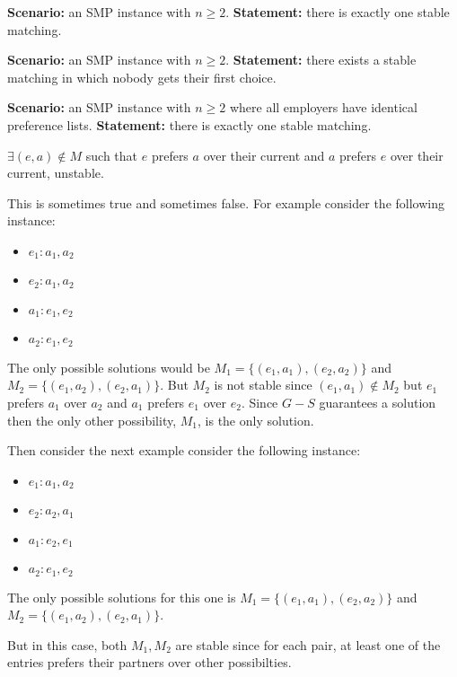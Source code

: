 \begin{questions}
	\question[3] \textbf{Scenario:} an SMP instance with $n \ge 2$. \textbf{Statement:} there is exactly one stable matching.
	\ifsolutions\fi

	\question[4] \textbf{Scenario:} an SMP instance with $n \ge 2$. \textbf{Statement:} there exists a stable matching in which nobody gets their first choice.
	\ifsolutions\fi

	\question[4] \textbf{Scenario:} an SMP instance with $n \ge 2$ where all employers have identical preference lists. \textbf{Statement:} there is exactly one stable matching.
	\ifsolutions\fi

	\(\exists (e, a) \notin M\) such that \(e\) prefers \(a\) over their current and \(a\) prefers \(e\) over their current, unstable.

	\begin{soln}
		This is sometimes true and sometimes false.
		For example consider the following instance:
		\begin{itemize}
			\item	\(e_1 : a_1, a_2\)
			\item \(e_2 : a_1, a_2\)
			\item \(a_1 : e_1, e_2\)
			\item \(a_2 : e_1, e_2\)
		\end{itemize}
		The only possible solutions would be \(M_1 = \{(e_1, a_1), (e_2, a_2)\}\) and \(M_2 = \{(e_1, a_2), (e_2, a_1)\}\).
		But \(M_2\) is not stable since \((e_1, a_1) \notin M_2\) but \(e_1\) prefers \(a_1\) over \(a_2\) and \(a_1\) prefers \(e_1\) over \(e_2\).
		Since \(G-S\) guarantees a solution then the only other possibility, \(M_1\), is the only solution.

		Then consider the next example consider the following instance:
		\begin{itemize}
			\item	\(e_1 : a_1, a_2\)
			\item \(e_2 : a_2, a_1\)
			\item \(a_1 : e_2, e_1\)
			\item \(a_2 : e_1, e_2\)
		\end{itemize}
		The only possible solutions for this one is \(M_1 = \{(e_1, a_1), (e_2, a_2)\}\) and \(M_2 = \{(e_1, a_2), (e_2, a_1)\}\).

		But in this case, both \(M_1, M_2\) are stable since for each pair, at least one of the entries prefers their partners over other possibilties.
	\end{soln}



\end{questions}
